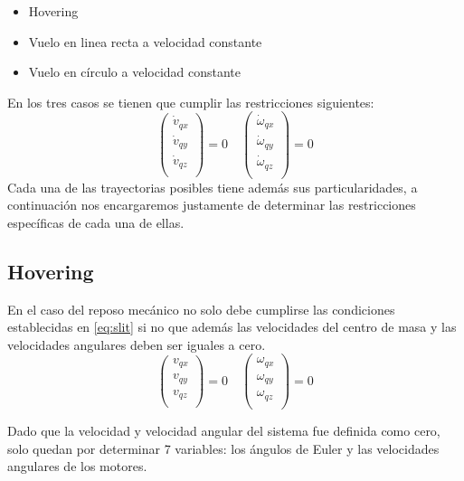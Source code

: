 \documentclass[main]{subfiles}
\begin{document}
\begin{itemize}
\item Hovering
\item Vuelo en linea recta a velocidad constante
\item Vuelo en c\'irculo a velocidad constante 
\end{itemize} 

En los tres casos se tienen que cumplir las restricciones siguientes:
\begin{equation}
\label{eq:slit}
\left(\begin{array}{c}
\dot{v}_{qx}\\
\dot{v}_{qy}\\
\dot{v}_{qz}\\
\end{array}\right)=0 \quad 
\left(\begin{array}{c}
\dot{\omega}_{qx}\\
\dot{\omega}_{qy}\\
\dot{\omega}_{qz}\\
\end{array}\right)=0
\end{equation}
Cada una de las trayectorias posibles tiene adem\'as sus particularidades, a continuaci\'on nos encargaremos justamente de determinar las restricciones espec\'ificas de cada una de ellas.

\subsection{Hovering}
En el caso del reposo mec\'anico no solo debe cumplirse las condiciones establecidas en \ref{eq:slit} si no que adem\'as las velocidades del centro de masa y las velocidades angulares deben ser iguales a cero.
\begin{equation}
\label{eq:quieto}
\left(\begin{array}{c}
v_{qx}\\
v_{qy}\\
v_{qz}\\
\end{array}\right)=0 \quad
\left(\begin{array}{c}
\omega_{qx}\\
\omega_{qy}\\
\omega_{qz}\\
\end{array}\right)=0
\end{equation}

Dado que la velocidad y velocidad angular del sistema fue definida como cero, solo quedan por determinar 7 variables: los \'angulos de Euler y las velocidades angulares de los motores. \\
\end{document}
